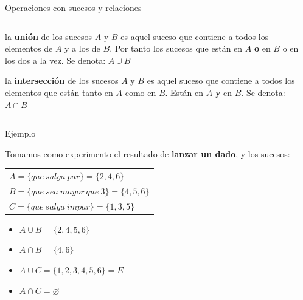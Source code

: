 \documentclass[11pt,handout]{beamer}
\begin{document}
\begin{frame}
{Operaciones con sucesos y relaciones}
\begin{columns}
\begin{column}{0.6\textwidth}
\begin{block}{}
la \textbf{unión} de los sucesos $A$ y $B$ es aquel suceso que contiene a todos los elementos de $A$ y a  los de $B$. Por tanto los sucesos que están en $A$ \textbf{o} en $B$ o en los dos a la vez. Se denota: $A\cup B$ 
\end{block}
\begin{block}{}
la \textbf{intersección} de los sucesos $A$ y $B$ es aquel suceso que contiene a todos los elementos que están tanto en $A$ como en $B$. Están en $A$ \textbf{y} en $B$. Se denota: $A\cap B$ 
\end{block}


\end{column}
\begin{column}{0.4\textwidth}



\end{column}
\end{columns}

\end{frame}

\begin{frame}
{Ejemplo}

 Tomamos como experimento el resultado de \textbf{lanzar un dado}, y los sucesos: \\
\begin{tabular}{l}
$A=\lbrace que\ salga\ par\rbrace=\lbrace2,4,6\rbrace$ \\
$B=\lbrace que\ sea\ mayor\ que\ 3\rbrace=\lbrace4,5,6\rbrace$ \\
$C=\lbrace que\ salga\ impar\rbrace=\lbrace1,3,5\rbrace$
\end{tabular}

\begin{itemize}	[<+->]
	\item $A\cup B=\lbrace2,4,5,6\rbrace$ \\
	\item $A\cap B=\lbrace4,6\rbrace$\\

	\item $A\cup C=\lbrace1,2,3,4,5,6\rbrace=E$
	\item $A\cap C=\varnothing$
\end{itemize}

\end{frame}
\end{document}
